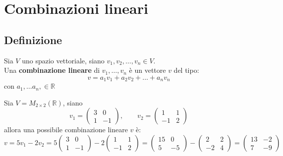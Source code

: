 \documentclass[
  a4paper,
]{article}
\begin{document}
\newpage

\hypertarget{combinazioni-lineari}{%
\section{Combinazioni lineari}\label{combinazioni-lineari}}

\hypertarget{definizione-1}{%
\subsection{Definizione}\label{definizione-1}}

\begin{definitionbox}
Sia \(V\) uno spazio vettoriale, siano \(v_1, v_2, \dots, v_n \in V\).\\
Una \textbf{combinazione lineare} di \(v_1, \dots, v_n\) è un vettore
\(v\) del tipo: \[
v = a_1v_1 + a_2v_2 + \dots + a_nv_n
\] con \(a_1, \dots a_n , \in \mathbb{R}\)
\end{definitionbox}

\begin{examplebox}
Sia \(V=M_{2\times 2}(\mathbb{R})\), siano \[  
v_1=  
\begin{pmatrix}  
3 & 0\\  
1 & -1  
\end{pmatrix},  
\qquad  
v_2=  
\begin{pmatrix}  
1 & 1\\  
-1 & 2  
\end{pmatrix} 
\] allora una possibile combinazione lineare \(v\) è: \[  
v=5v_1-2v_2  
=5\begin{pmatrix}  
3 & 0\\  
1 & -1  
\end{pmatrix}  
-2\begin{pmatrix}  
1 & 1\\  
-1 & 2  
\end{pmatrix}  
=  
\begin{pmatrix}  
15 & 0\\  
5 & -5  
\end{pmatrix}  
-  
\begin{pmatrix}  
2 & 2\\  
-2 & 4  
\end{pmatrix}  
=  
\begin{pmatrix}  
13 & -2\\  
7 & -9  
\end{pmatrix}
\]
\end{examplebox}
\end{document}

